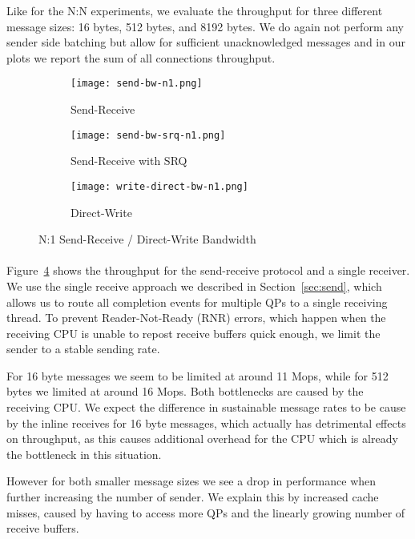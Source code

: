 Like for the N:N experiments, we evaluate the throughput for three different message sizes: 16 bytes, 
512 bytes, and 8192 bytes. We do again not perform any sender side batching but allow for sufficient unacknowledged messages 
and in our plots we report the sum of all connections throughput.


\begin{figure}[ht]
  \centering
\begin{subfigure}[b]{0.49\textwidth}
  \centering
  \texttt{[image: send-bw-n1.png]}
  \caption{Send-Receive}
  \label{fig:plot-sndrcv-bw-n1-nosrq}
\end{subfigure}
\begin{subfigure}[b]{0.49\textwidth}
  \centering
  \texttt{[image: send-bw-srq-n1.png]}
  \caption{Send-Receive with SRQ}
  \label{fig:plot-sndrcv-bw-n1-srq}
\end{subfigure}
  \begin{subfigure}[b]{0.48\textwidth}
  \centering
  \texttt{[image: write-direct-bw-n1.png]}
  \caption{Direct-Write}
  \label{fig:plot-wdir-bw-n1}
  \end{subfigure}
\caption{N:1 Send-Receive / Direct-Write Bandwidth}
  \label{fig:plot-sndrcv-bw-n1}
\end{figure}



\paragraph{} Figure~\ref{fig:plot-sndrcv-bw-n1} shows the throughput for the send-receive protocol and a single receiver. We
use the single receive approach we described in Section~\ref{sec:send}, which allows us to route all completion events for 
multiple QPs to a single receiving thread. To prevent Reader-Not-Ready (RNR) errors, which happen when the receiving CPU is 
unable to repost receive buffers quick enough, we limit the sender to a stable sending rate.

For 16 byte messages we seem to be limited at around 11 Mops, while for 512 bytes we limited at around 16 Mops. Both bottlenecks
are caused by the receiving CPU. We expect the difference in sustainable message rates to be cause by the inline receives for 
16 byte messages, which actually has detrimental effects on throughput, as this causes additional overhead for the CPU which 
is already the bottleneck in this situation.

However for both smaller message sizes we see a drop in performance when further increasing the number of sender. We explain 
this by increased cache misses, caused by having to access more QPs and the linearly growing number of receive buffers.

